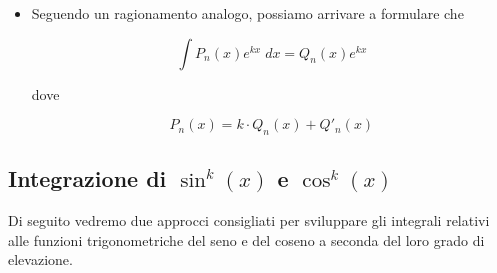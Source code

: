 \documentclass[a4paper, 12pt]{report}
\begin{document}
\begin{enumerate}
\begin{itemize}
\begin{itemize}
                \item Infine, quindi, concludiamo che
                
                \[ \int (x^3-3x^2+8x-11)e^x \; dx = (x^3 -6x^2 + 20x - 31)e^x+c\]
            \end{itemize}
            
            \item Seguendo un ragionamento analogo, possiamo arrivare a formulare che
            
            \[ \int P_n(x)e^{kx} \; dx = Q_n(x)e^{kx}\]
            
            dove 
            
            \[ P_n(x) = k \cdot Q_n(x)+Q'_n(x) \]
        \end{itemize}
    \end{enumerate}
    
    \subsection{Integrazione di $\sin^k(x)$ e $\cos^k(x)$ }
    
    Di seguito vedremo due approcci consigliati per sviluppare gli integrali relativi alle funzioni trigonometriche del seno e del coseno a seconda del loro grado di elevazione.
    
\end{document}
